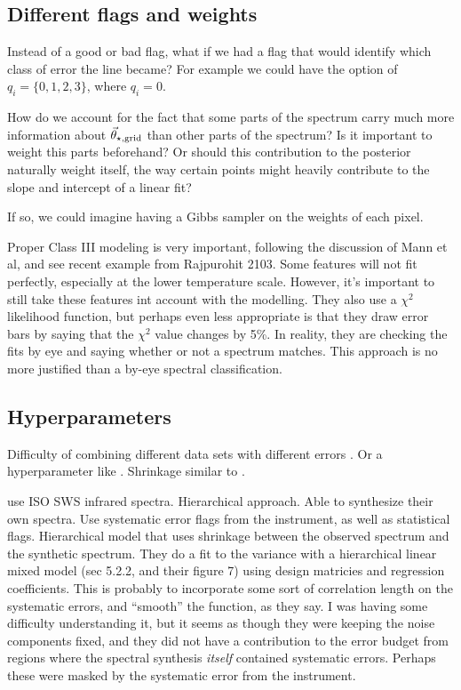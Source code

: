 \documentclass[preprint]{aastex} %
\newcommand{\vt}{\vec{\theta}}
\newcommand{\vg}{\vt_{\star, {\rm grid}}}
\begin{document}
\subsection{Different flags and weights}
Instead of a good or bad flag, what if we had a flag that would identify which class of error the line became? For example we could have the option of $q_i = \{0, 1, 2, 3\}$, where $q_i=0$. 

How do we account for the fact that some parts of the spectrum carry much more information about $\vg$ than other parts of the spectrum? Is it important to weight this parts beforehand? Or should this contribution to the posterior naturally weight itself, the way certain points might heavily contribute to the slope and intercept of a linear fit?

If so, we could imagine having a Gibbs sampler on the weights of each pixel.

Proper Class III modeling is very important, following the discussion of \citep{mga13} Mann et al, and see recent example from Rajpurohit 2103. Some features will not fit perfectly, especially at the lower temperature scale. However, it's important to still take these features int account with the modelling. They also use a $\chi^2$ likelihood function, but perhaps even less appropriate is that they draw error bars by saying that the $\chi^2$ value changes by 5\%. In reality, they are checking the fits by eye and saying whether or not a spectrum matches. This approach is no more justified than a by-eye spectral classification.

\subsection{Hyperparameters}
Difficulty of combining different data sets with different errors \citep{mb13}. Or a hyperparameter like \citep{sdm+07}. Shrinkage similar to \citet{kru10}.

\citet{sdm+07} use ISO SWS infrared spectra. Hierarchical approach. Able to synthesize their own spectra. Use systematic error flags from the instrument, as well as statistical flags. Hierarchical model that uses shrinkage between the observed spectrum and the synthetic spectrum. They do a fit to the variance with a hierarchical linear mixed model (sec 5.2.2, and their figure 7) using design matricies and regression coefficients. This is probably to incorporate some sort of correlation length on the systematic errors, and ``smooth'' the function, as they say. I was having some difficulty understanding it, but it seems as though they were keeping the noise components fixed, and they did not have a contribution to the error budget from regions where the spectral synthesis \emph{itself} contained systematic errors. Perhaps these were masked by the systematic error from the instrument. 
\end{document}

